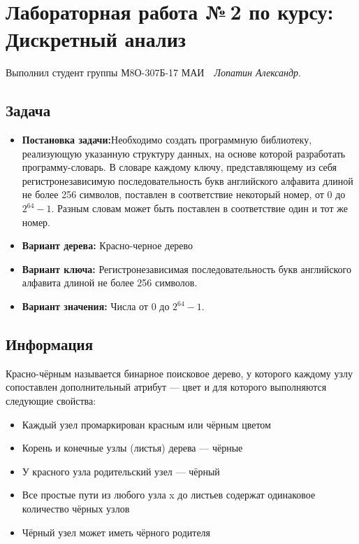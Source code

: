 \documentclass[12pt]{article}
\begin{document}
\section*{\centering Лабораторная работа №\,2 по курсу:\\ Дискретный анализ}

Выполнил студент группы М8О-307Б-17 МАИ \,\, \textit{Лопатин Александр}.

\subsection*{Задача}
\begin{itemize}
\item {\bf Постановка задачи:}\subitem Необходимо создать программную библиотеку, реализующую указанную структуру данных, на основе которой разработать программу-словарь. В словаре каждому ключу, представляющему из себя регистронезависимую последовательность букв английского алфавита длиной не более 256 символов, поставлен в соответствие некоторый номер, от 0 до $2^{64} - 1$. Разным словам может быть поставлен в соответствие один и тот же номер.

\item {\bf Вариант дерева: }\subitem  Красно-черное дерево

\item{ \bf Вариант ключа:} \subitem Регистронезависимая последовательность букв английского алфавита длиной не более 256 символов.


\item {\bf Вариант значения:} \subitem   Числа от $0$ до $2^{64} − 1$.

\end{itemize}

\subsection*{Информация}

Красно-чёрным называется бинарное поисковое дерево, у которого каждому узлу сопоставлен дополнительный атрибут — цвет и для которого выполняются следующие свойства:\\
\begin{itemize}
\item Каждый узел промаркирован красным или чёрным цветом
\item Корень и конечные узлы (листья) дерева — чёрные
\item У красного узла родительский узел — чёрный
\item Все простые пути из любого узла x до листьев содержат одинаковое количество чёрных узлов
\item Чёрный узел может иметь чёрного родителя
\end{itemize}
\end{document}
